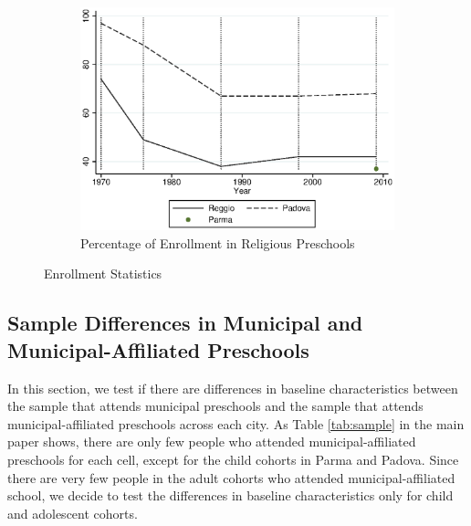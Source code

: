 \begin{figure}[H]
\begin{subfigure}[ht]{0.48\textwidth}
        \includegraphics[width=\textwidth]{../../output/image/enroll_per_priv_graph.eps}
        \caption{Percentage of Enrollment in Religious Preschools}
        \label{fig:large}
      \end{subfigure}
      \caption{Enrollment Statistics}  \label{fig:enrollment}
    \end{figure}    
    
    
\subsection{Sample Differences in Municipal and Municipal-Affiliated Preschools}

In this section, we test if there are differences in baseline characteristics between the sample that attends municipal preschools and the sample that attends municipal-affiliated preschools across each city. As Table \ref{tab:sample} in the main paper shows, there are only few people who attended municipal-affiliated preschools for each cell, except for the child cohorts in Parma and Padova. Since there are very few people in the adult cohorts who attended municipal-affiliated school, we decide to test the differences in baseline characteristics only for child and adolescent cohorts. 

 
    